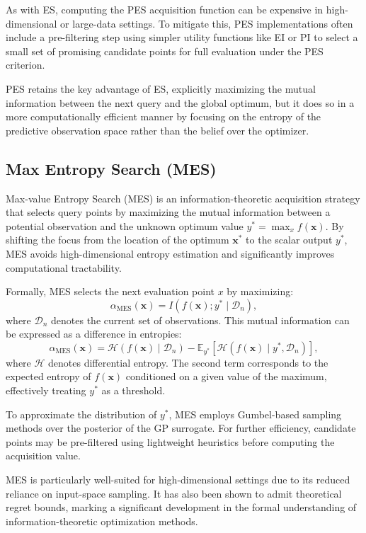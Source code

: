 \documentclass{ut-thesis}
\begin{document}
As with ES, computing the PES acquisition function can be expensive in high-dimensional or large-data settings. To mitigate this, PES implementations often include a pre-filtering step using simpler utility functions like EI or PI to select a small set of promising candidate points for full evaluation under the PES criterion.

PES retains the key advantage of ES, explicitly maximizing the mutual information between the next query and the global optimum, but it does so in a more computationally efficient manner by focusing on the entropy of the predictive observation space rather than the belief over the optimizer.


\subsection{Max Entropy Search (MES)}

Max-value Entropy Search (MES) is an information-theoretic acquisition strategy that selects query points by maximizing the mutual information between a potential observation and the unknown optimum value \( y^* = \max_{x} f(\mathbf{x}) \). By shifting the focus from the location of the optimum \( \mathbf{x}^* \) to the scalar output \( y^* \), MES avoids high-dimensional entropy estimation and significantly improves computational tractability.

Formally, MES selects the next evaluation point \( x \) by maximizing:
\[
\alpha_{\text{MES}}(\mathbf{\mathbf{x}}) = I(f(\mathbf{x}); y^* \mid \mathcal{D}_n),
\]
where \( \mathcal{D}_n \) denotes the current set of observations. This mutual information can be expressed as a difference in entropies:
\[
\alpha_{\text{MES}}(\mathbf{x}) = \mathcal{H}(f(\mathbf{x}) \mid \mathcal{D}_n) - \mathbb{E}_{y^*}[\mathcal{H}(f(\mathbf{x}) \mid y^*, \mathcal{D}_n)],
\]
where \( \mathcal{H} \) denotes differential entropy. The second term corresponds to the expected entropy of \( f(\mathbf{x}) \) conditioned on a given value of the maximum, effectively treating \( y^* \) as a threshold.

To approximate the distribution of \( y^* \), MES employs Gumbel-based sampling methods over the posterior of the GP surrogate. For further efficiency, candidate points may be pre-filtered using lightweight heuristics before computing the acquisition value.

MES is particularly well-suited for high-dimensional settings due to its reduced reliance on input-space sampling. It has also been shown to admit theoretical regret bounds, marking a significant development in the formal understanding of information-theoretic optimization methods.
\end{document}
